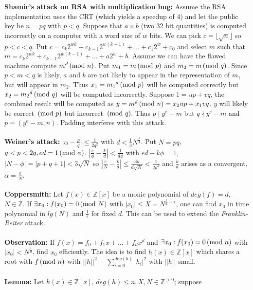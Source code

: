 {\bf Shamir's attack on RSA with multiplication bug:}
Assume the RSA implementation uses the CRT (which yields a speedup of $4$) and let
the public key be $n=pq$ with $p<q$.  Suppose that $a \times b$ (two
$32$ bit quantities) is computed
incorrectly on a computer with a word size of $w$ bits.  We can pick
$c= \lfloor {\sqrt n} \rfloor$ so $p<c<q$.  Put
$c= c_{k}2^{wk} + c_{k-1}2^{w(k-1)} + \ldots + c_{1}2^{w} + c_0$ and select $m$ such that
$m= c_{k}2^{wk} + c_{k-1}2^{w(k-1)} + \ldots + a2^{w} + b$.  Assume we can have the
flawed machine compute $m^d \thinspace \textnormal{(mod } n \textnormal{)}$.  Put
$m_1 = m \thinspace \textnormal{(mod } p \textnormal{)}$ and $m_2 = m \thinspace \textnormal{(mod } q \textnormal{)}$.
Since $p<m<q$ is likely, $a$ and $b$ are not likely
to appear in the representation of $m_1$ but will appear in $m_2$. Thus
$x_1= {m_1}^d \thinspace \textnormal{(mod } p \textnormal{)}$ will be computed correctly but $x_2= {m_2}^d \thinspace \textnormal{(mod } q \textnormal{)}$ will be computed incorrectly. 
Suppose $1= up+vq$, the combined result will be computed as $y= m^d \thinspace \textnormal{(mod } n \textnormal{)}= x_2 up + x_1 vq$.
$y$ will likely be correct
$\thinspace \textnormal{(mod } p \textnormal{)}$ but incorrect $\thinspace \textnormal{(mod } q \textnormal{)}$.  Thus $p \mid y^e-m$ but
$q \nmid y^e-m$ and $p= (y^e-m,n)$.  Padding interferes with this attack.
\\
\\
{\bf Weiner's attack:} 
$|\alpha - {\frac p q}| \le {\frac 1 {2q^2}}$ with $d< {\frac 1 3} N^{\frac 1 4}$.
Put $N=pq$, $q<p<2q, ed=1 \thinspace \textnormal{(mod } \phi \textnormal{)}$.  $|{\frac e {\phi}} - {\frac k d}| < {\frac 1 {d \phi}}$
with $ed-k \phi=1$, $|N- \phi|=|p+q+1|< 3 {\sqrt N}$ so 
$|{\frac e N}-{\frac k d}| \le {\frac {3k} {d {\sqrt N}}}< {\frac 1 {2d^2}}$ and 
${\frac k d}$ arises as a convergent, $\alpha={\frac e N}$.
\\
\\
{\bf Coppersmith:}  Let $f(x) \in {\mathbb Z}[x]$ be a monic polynomial
of $deg(f)=d$, $N \in {\mathbb Z}$.  If 
$\exists x_0 : f(x_0) = 0 \thinspace \textnormal{(mod } N \textnormal{)}$
with $|x_0| \le X= N^{{\frac 1 d} - \epsilon}$, one can find $x_0$ in time polynomial in
$lg(N)$ and ${\frac 1 {\epsilon}}$ for fixed $d$.  This can be used to extend the 
\emph {Franklin-Reiter} attack.
\\
\\
{\bf Observation:}
If $f(x)=f_0 + f_1 x + \ldots + f_d x^d$ and $\exists x_0: f(x_0)= 0 \thinspace \textnormal{(mod } n \textnormal{)}$ with
$|x_0| < N^{\frac 1 d}$, find $x_0$ efficiently.  The idea is to 
find $h(x) \in {\mathbb Z}[x]$ which
shares a root with $f \thinspace \textnormal{(mod } n \textnormal{)}$ with $||h||^2= \sum_{i=0}^{deg(h)} |h_i |^2$ with
$||h||$ small.
\\
\\
{\bf Lemma:} Let $h(x) \in {\mathbb Z}[x]$, $deg(h)\le n, X,N \in {\mathbb Z}^{>0}$;  suppose

